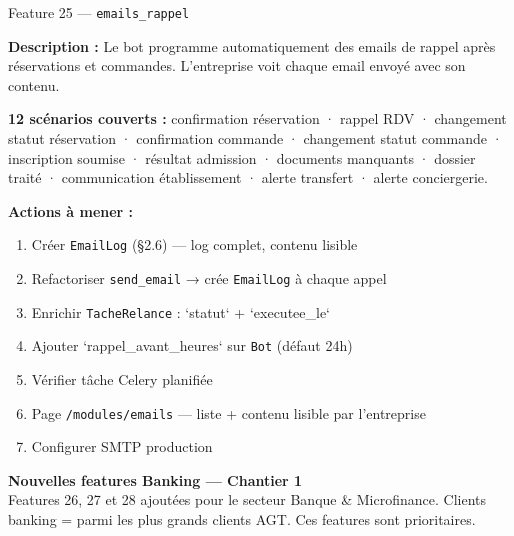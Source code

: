 \documentclass[11pt,a4paper]{article}
\newcommand{\slug}[1]{\texttt{\color{AGTDark}#1}}
\newcommand{\banking}[1]{\textcolor{AGTBanking}{\textbf{#1}}}
\begin{document}
\begin{featurebox}{Feature 25 — \slug{emails\_rappel}}

\textbf{Description :} Le bot programme automatiquement des emails de rappel après
réservations et commandes. L'entreprise voit chaque email envoyé avec son contenu.

\textbf{12 scénarios couverts :} confirmation réservation · rappel RDV · changement
statut réservation · confirmation commande · changement statut commande · inscription
soumise · résultat admission · documents manquants · dossier traité · communication
établissement · alerte transfert · alerte conciergerie.

\textbf{Actions à mener :}
\begin{enumerate}
  \item Créer \slug{EmailLog} (§2.6) — log complet, contenu lisible
  \item Refactoriser \slug{send\_email} → crée \slug{EmailLog} à chaque appel
  \item Enrichir \slug{TacheRelance} : `statut` + `executee\_le`
  \item Ajouter `rappel\_avant\_heures` sur \slug{Bot} (défaut 24h)
  \item Vérifier tâche Celery planifiée
  \item Page \texttt{/modules/emails} — liste + contenu lisible par l'entreprise
  \item Configurer SMTP production
\end{enumerate}

\end{featurebox}

\bigskip


\begin{bankingbox}
\banking{Nouvelles features Banking — Chantier 1}\\
Features 26, 27 et 28 ajoutées pour le secteur Banque \& Microfinance.
Clients banking = parmi les plus grands clients AGT. Ces features sont prioritaires.
\end{bankingbox}

\bigskip
\end{document}

